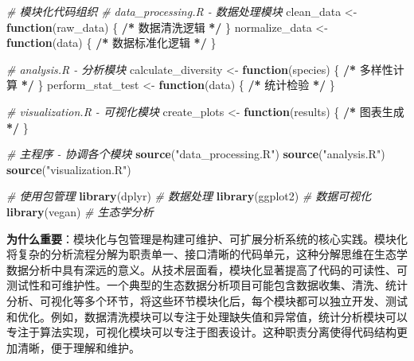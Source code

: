 \documentclass[
]{book}
\newenvironment{Shaded}{\begin{snugshade}}{\end{snugshade}}
\newcommand{\CommentTok}[1]{\textcolor[rgb]{0.56,0.35,0.01}{\textit{#1}}}
\newcommand{\ControlFlowTok}[1]{\textcolor[rgb]{0.13,0.29,0.53}{\textbf{#1}}}
\newcommand{\ErrorTok}[1]{\textcolor[rgb]{0.64,0.00,0.00}{\textbf{#1}}}
\newcommand{\FunctionTok}[1]{\textcolor[rgb]{0.13,0.29,0.53}{\textbf{#1}}}
\newcommand{\NormalTok}[1]{#1}
\newcommand{\OtherTok}[1]{\textcolor[rgb]{0.56,0.35,0.01}{#1}}
\newcommand{\SpecialCharTok}[1]{\textcolor[rgb]{0.81,0.36,0.00}{\textbf{#1}}}
\newcommand{\StringTok}[1]{\textcolor[rgb]{0.31,0.60,0.02}{#1}}
\begin{document}
\begin{Shaded}
\begin{Highlighting}[]
\CommentTok{\# 模块化代码组织}
\CommentTok{\# data\_processing.R {-} 数据处理模块}
\NormalTok{clean\_data }\OtherTok{\textless{}{-}} \ControlFlowTok{function}\NormalTok{(raw\_data) \{ }\SpecialCharTok{/}\ErrorTok{*}\NormalTok{ 数据清洗逻辑 }\SpecialCharTok{*}\ErrorTok{/}\NormalTok{ \}}
\NormalTok{normalize\_data }\OtherTok{\textless{}{-}} \ControlFlowTok{function}\NormalTok{(data) \{ }\SpecialCharTok{/}\ErrorTok{*}\NormalTok{ 数据标准化逻辑 }\SpecialCharTok{*}\ErrorTok{/}\NormalTok{ \}}

\CommentTok{\# analysis.R {-} 分析模块}
\NormalTok{calculate\_diversity }\OtherTok{\textless{}{-}} \ControlFlowTok{function}\NormalTok{(species) \{ }\SpecialCharTok{/}\ErrorTok{*}\NormalTok{ 多样性计算 }\SpecialCharTok{*}\ErrorTok{/}\NormalTok{ \}}
\NormalTok{perform\_stat\_test }\OtherTok{\textless{}{-}} \ControlFlowTok{function}\NormalTok{(data) \{ }\SpecialCharTok{/}\ErrorTok{*}\NormalTok{ 统计检验 }\SpecialCharTok{*}\ErrorTok{/}\NormalTok{ \}}

\CommentTok{\# visualization.R {-} 可视化模块}
\NormalTok{create\_plots }\OtherTok{\textless{}{-}} \ControlFlowTok{function}\NormalTok{(results) \{ }\SpecialCharTok{/}\ErrorTok{*}\NormalTok{ 图表生成 }\SpecialCharTok{*}\ErrorTok{/}\NormalTok{ \}}

\CommentTok{\# 主程序 {-} 协调各个模块}
\FunctionTok{source}\NormalTok{(}\StringTok{"data\_processing.R"}\NormalTok{)}
\FunctionTok{source}\NormalTok{(}\StringTok{"analysis.R"}\NormalTok{)}
\FunctionTok{source}\NormalTok{(}\StringTok{"visualization.R"}\NormalTok{)}

\CommentTok{\# 使用包管理}
\FunctionTok{library}\NormalTok{(dplyr)    }\CommentTok{\# 数据处理}
\FunctionTok{library}\NormalTok{(ggplot2)  }\CommentTok{\# 数据可视化}
\FunctionTok{library}\NormalTok{(vegan)    }\CommentTok{\# 生态学分析}
\end{Highlighting}
\end{Shaded}

\textbf{为什么重要}：模块化与包管理是构建可维护、可扩展分析系统的核心实践。模块化将复杂的分析流程分解为职责单一、接口清晰的代码单元，这种分解思维在生态学数据分析中具有深远的意义。从技术层面看，模块化显著提高了代码的可读性、可测试性和可维护性。一个典型的生态数据分析项目可能包含数据收集、清洗、统计分析、可视化等多个环节，将这些环节模块化后，每个模块都可以独立开发、测试和优化。例如，数据清洗模块可以专注于处理缺失值和异常值，统计分析模块可以专注于算法实现，可视化模块可以专注于图表设计。这种职责分离使得代码结构更加清晰，便于理解和维护。
\end{document}
